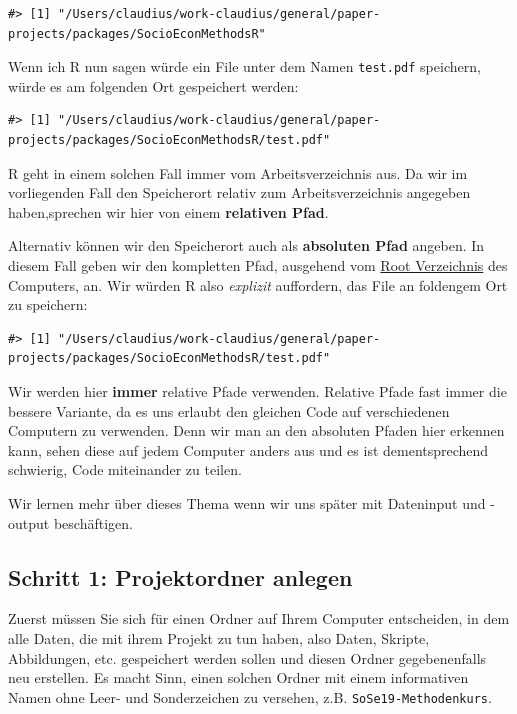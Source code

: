\documentclass[]{book}
\begin{document}
\begin{verbatim}
#> [1] "/Users/claudius/work-claudius/general/paper-projects/packages/SocioEconMethodsR"
\end{verbatim}

Wenn ich R nun sagen würde ein File unter dem Namen \texttt{test.pdf}
speichern, würde es am folgenden Ort gespeichert werden:

\begin{verbatim}
#> [1] "/Users/claudius/work-claudius/general/paper-projects/packages/SocioEconMethodsR/test.pdf"
\end{verbatim}

R geht in einem solchen Fall immer vom Arbeitsverzeichnis aus. Da wir im
vorliegenden Fall den Speicherort relativ zum Arbeitsverzeichnis
angegeben haben,sprechen wir hier von einem \textbf{relativen Pfad}.

Alternativ können wir den Speicherort auch als \textbf{absoluten Pfad}
angeben. In diesem Fall geben wir den kompletten Pfad, ausgehend vom
\href{https://de.wikipedia.org/wiki/Stammverzeichnis}{Root Verzeichnis}
des Computers, an. Wir würden R also \emph{explizit} auffordern, das
File an foldengem Ort zu speichern:

\begin{verbatim}
#> [1] "/Users/claudius/work-claudius/general/paper-projects/packages/SocioEconMethodsR/test.pdf"
\end{verbatim}

Wir werden hier \textbf{immer} relative Pfade verwenden. Relative Pfade
fast immer die bessere Variante, da es uns erlaubt den gleichen Code auf
verschiedenen Computern zu verwenden. Denn wir man an den absoluten
Pfaden hier erkennen kann, sehen diese auf jedem Computer anders aus und
es ist dementsprechend schwierig, Code miteinander zu teilen.

Wir lernen mehr über dieses Thema wenn wir uns später mit Dateninput und
-output beschäftigen.

\subsection{Schritt 1: Projektordner
anlegen}\label{schritt-1-projektordner-anlegen}

Zuerst müssen Sie sich für einen Ordner auf Ihrem Computer entscheiden,
in dem alle Daten, die mit ihrem Projekt zu tun haben, also Daten,
Skripte, Abbildungen, etc. gespeichert werden sollen und diesen Ordner
gegebenenfalls neu erstellen. Es macht Sinn, einen solchen Ordner mit
einem informativen Namen ohne Leer- und Sonderzeichen zu versehen, z.B.
\texttt{SoSe19-Methodenkurs}.
\end{document}
